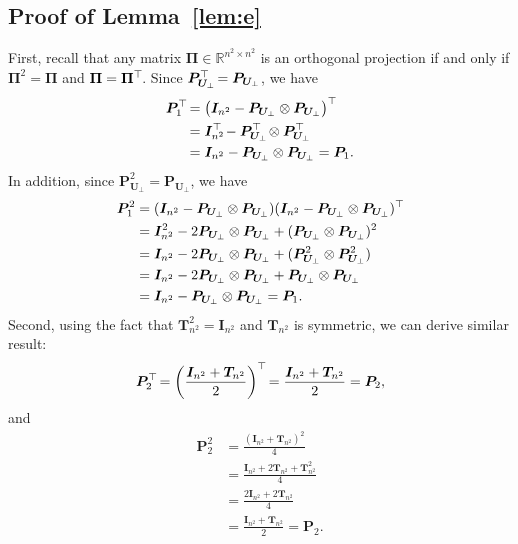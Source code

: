 \documentclass{article}
\def\R{{\mathbb R}}
\newcommand{\topnew}{\top \hspace{-0.05cm}}
\begin{document}
\subsection{Proof of Lemma~\ref{lem:e}}
First, recall that any matrix $\bm \Pi \in \R^{n^2 \times n^2}$ is an orthogonal projection if and only if $\bm \Pi^2 = \bm \Pi$ and $\bm \Pi = \bm \Pi^\topnew$. Since $\bm P_{\bm U_\perp}^\topnew = \bm P_{\bm U_\perp}$, we have
\begin{align*}
    \bm P_1^\topnew &= \bigl(\bm I_{n^2} - \bm P_{\bm U_\perp} \otimes \bm P_{\bm U_\perp}\bigr)^\topnew \\
    &= \bm I_{n^2}^\topnew - \bm P_{\bm U_\perp}^\topnew \otimes \bm P_{\bm U_\perp}^\topnew \\
    &= \bm I_{n^2} - \bm P_{\bm U_\perp} \otimes \bm P_{\bm U_\perp} = \bm P_1 .
\end{align*}
In addition, since $\bm P_{\bm U_\perp}^2 = \bm P_{\bm U_\perp}$, we have
\begin{align*}
    \bm P_1 ^2 &= (\bm I_{n^2} - \bm P_{\bm U_\perp} \otimes \bm P_{\bm U_\perp}) (\bm I_{n^2} - \bm P_{\bm U_\perp} \otimes \bm P_{\bm U_\perp})^\topnew \\
    &= \bm I_{n^2}^2 - 2 \bm P_{\bm U_\perp} \otimes \bm P_{\bm U_\perp} + (\bm P_{\bm U_\perp} \otimes \bm P_{\bm U_\perp})^2 \\
    &= \bm I_{n^2} - 2 \bm P_{\bm U_\perp} \otimes \bm P_{\bm U_\perp} + (\bm P_{\bm U_\perp}^2 \otimes \bm P_{\bm U_\perp}^2) \\
    &= \bm I_{n^2} - 2 \bm P_{\bm U_\perp} \otimes \bm P_{\bm U_\perp} + \bm P_{\bm U_\perp} \otimes \bm P_{\bm U_\perp} \\
    &= \bm I_{n^2} - \bm P_{\bm U_\perp} \otimes \bm P_{\bm U_\perp} = \bm P_1.
\end{align*}
Second, using the fact that $\bm T_{n^2}^2 = \bm I_{n^2}$ and $\bm T_{n^2}$ is symmetric, we can derive similar result: 
\begin{align*}
    \bm P_2^\topnew = \biggl( \frac{\bm I_{n^2} + \bm T_{n^2}}{2} \biggr)^\topnew = \frac{\bm I_{n^2} + \bm T_{n^2}}{2} = \bm P_2 ,
\end{align*}
and 
\begin{align*}
    \bm P_2^2 &= \frac{(\bm I_{n^2} + \bm T_{n^2})^2}{4} \\
    &= \frac{\bm I_{n^2} + 2 \bm T_{n^2} + \bm T^2_{n^2}}{4} \\
    &= \frac{2\bm I_{n^2} + 2\bm T_{n^2}}{4} \\
    &= \frac{\bm I_{n^2} + \bm T_{n^2}}{2} = \bm P_2 .
\end{align*}
\end{document}
